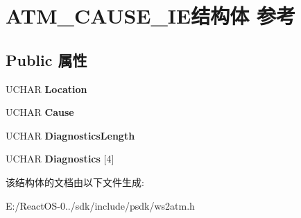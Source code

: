 \hypertarget{struct_a_t_m___c_a_u_s_e___i_e}{}\section{A\+T\+M\+\_\+\+C\+A\+U\+S\+E\+\_\+\+I\+E结构体 参考}
\label{struct_a_t_m___c_a_u_s_e___i_e}
\subsection*{Public 属性}
\begin{DoxyCompactItemize}
\item 
\mbox{\label{struct_a_t_m___c_a_u_s_e___i_e_a61a457ca10483229eaa47788406466f4}} 
U\+C\+H\+AR {\bfseries Location}
\item 
\mbox{\label{struct_a_t_m___c_a_u_s_e___i_e_a5acf451f41567f79dee65d49d24081a4}} 
U\+C\+H\+AR {\bfseries Cause}
\item 
\mbox{\label{struct_a_t_m___c_a_u_s_e___i_e_a33d244547a76454f816b0acd9124eaea}} 
U\+C\+H\+AR {\bfseries Diagnostics\+Length}
\item 
\mbox{\label{struct_a_t_m___c_a_u_s_e___i_e_aa87fc4a489c84f0c669613be2f67c8bc}} 
U\+C\+H\+AR {\bfseries Diagnostics} \mbox{[}4\mbox{]}
\end{DoxyCompactItemize}


该结构体的文档由以下文件生成\+:\begin{DoxyCompactItemize}
\item 
E\+:/\+React\+O\+S-\/0../sdk/include/psdk/ws2atm.\+h\end{DoxyCompactItemize}
